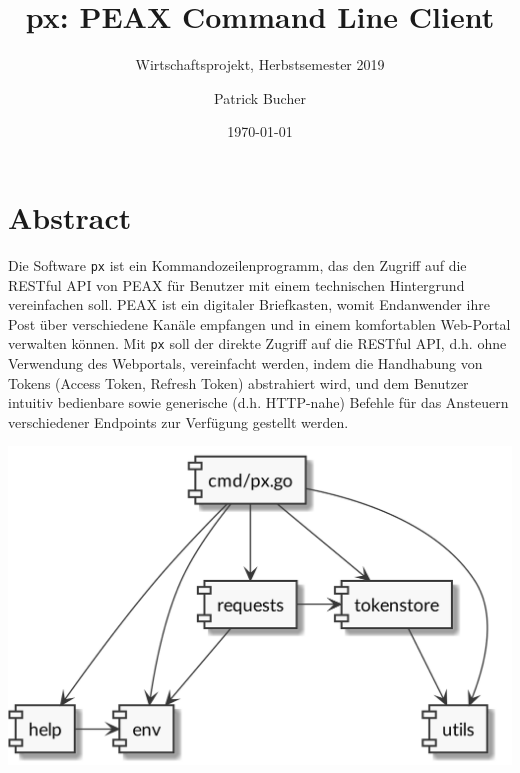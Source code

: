 \author{Patrick Bucher}
\title{px: PEAX Command Line Client}
\subtitle{Wirtschaftsprojekt, Herbstsemester 2019}
\date{\today}
\maketitle
\thispagestyle{empty}

\section*{Abstract}

Die Software \texttt{px} ist ein Kommandozeilenprogramm, das den Zugriff auf die RESTful API von PEAX für Benutzer mit einem technischen Hintergrund vereinfachen soll. PEAX ist ein digitaler Briefkasten, womit Endanwender ihre Post über verschiedene Kanäle empfangen und in einem komfortablen Web-Portal verwalten können. Mit \texttt{px} soll der direkte Zugriff auf die RESTful API, d.h. ohne Verwendung des Webportals, vereinfacht werden, indem die Handhabung von Tokens (Access Token, Refresh Token) abstrahiert wird, und dem Benutzer intuitiv bedienbare sowie generische (d.h. HTTP-nahe) Befehle für das Ansteuern verschiedener Endpoints zur Verfügung gestellt werden.

\vfill

\begin{center}
    \includegraphics[width=0.7\linewidth]{pics/title.png}
\end{center}
